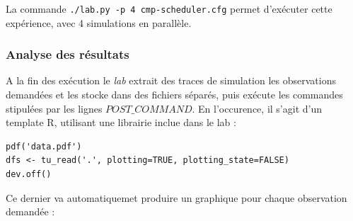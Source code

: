 \documentclass[parallelisme]{compas2017}
\begin{document}
La commande \texttt{./lab.py -p 4 cmp-scheduler.cfg} permet d'exécuter 
cette expérience, avec 4 simulations en parallèle.

\subsubsection{Analyse des résultats}

A la fin des exécution le \emph{lab} extrait des traces de simulation les 
observations demandées et les stocke dans des fichiers séparés, puis exécute 
les commandes stipulées par les lignes \texttt{$POST\_COMMAND$}. En 
l'occurence, il s'agit d'un template R, utilisant une librairie inclue dans le 
lab :

\begin{lstlisting}
pdf('data.pdf')
dfs <- tu_read('.', plotting=TRUE, plotting_state=FALSE)
dev.off()
\end{lstlisting}

Ce dernier va automatiquemet produire un graphique pour chaque observation 
demandée :
\end{document}
